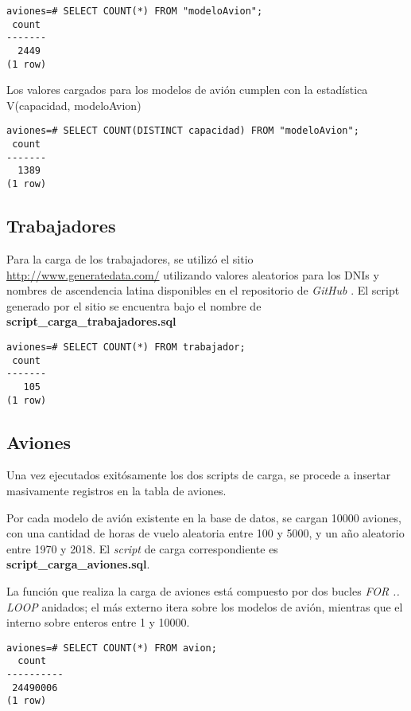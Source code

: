 \vspace*{5mm}
\lstset{style=sql}
\begin{lstlisting}
aviones=# SELECT COUNT(*) FROM "modeloAvion";
 count 
-------
  2449
(1 row)
\end{lstlisting}

Los valores cargados para los modelos de avión cumplen con la estadística V(capacidad, modeloAvion) 

\vspace*{5mm}
\lstset{style=sql}
\begin{lstlisting}
aviones=# SELECT COUNT(DISTINCT capacidad) FROM "modeloAvion";
 count 
-------
  1389
(1 row)
\end{lstlisting}

\subsection{Trabajadores}

Para la carga de los trabajadores, se utilizó el sitio \url{http://www.generatedata.com/} utilizando valores aleatorios para los DNIs y nombres de ascendencia latina disponibles en el repositorio de \emph{GitHub} \cite{apellidos}. El script generado por el sitio se encuentra bajo el nombre de \textbf{script\_carga\_trabajadores.sql} 

\vspace*{5mm}
\lstset{style=sql}
\begin{lstlisting}
aviones=# SELECT COUNT(*) FROM trabajador;
 count 
-------
   105
(1 row)
\end{lstlisting}


\subsection{Aviones}
Una vez ejecutados exitósamente los dos scripts de carga, se procede a insertar masivamente registros en la tabla de aviones. 

Por cada modelo de avión existente en la base de datos, se cargan 10000 aviones, con una cantidad de horas de vuelo aleatoria entre 100 y 5000, y un año aleatorio entre 1970 y 2018. El \emph{script} de carga correspondiente es \textbf{script\_carga\_aviones.sql}.

La función que realiza la carga de aviones está compuesto por dos bucles \emph{FOR .. LOOP} anidados; el más externo itera sobre los modelos de avión, mientras que el interno sobre enteros entre 1 y 10000. 

\vspace*{5mm}
\lstset{style=sql}
\begin{lstlisting}
aviones=# SELECT COUNT(*) FROM avion;
  count   
----------
 24490006
(1 row)
\end{lstlisting}

